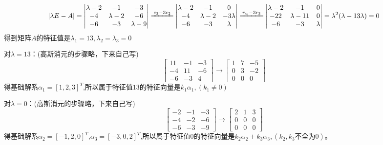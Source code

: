 \documentclass{article}
\begin{document}
\begin{jie}
\begin{align*}
 |\lambda E-A|=
 \begin{vmatrix}
  \lambda-2 & -1 & -3\\
  -4& \lambda-2 & -6\\
  -6 & -3 & \lambda-9
 \end{vmatrix}\xlongequal{\substack{c_{3}-3c_{2}}}
  \begin{vmatrix}
  \lambda-2 & -1 & 0\\
  -4& \lambda-2 & -3\lambda\\
  -6 & -3 & \lambda
 \end{vmatrix}\xlongequal{\substack{r_{w}-3r_{3}}}
  \begin{vmatrix}
  \lambda-2 & -1 & 0\\
  -22& \lambda-11 & 0\\
  -6 & -3 & \lambda
 \end{vmatrix}=\lambda^2(\lambda-13\lambda)=0
\end{align*}
得到矩阵$A$的特征值是$\lambda_1=13,\lambda_2=\lambda_3=0$

对$\lambda=13$：(高斯消元的步骤略，下来自己写)
\begin{equation*}
  \begin{bmatrix}
  11 & -1 & -3\\
  -4& 11 & -6\\
  -6 & -3 & 4
  \end{bmatrix}\rightarrow
  \begin{bmatrix}
  1& 7 & -5\\
  0& 3 & -2\\
  0 & 0 & 0
  \end{bmatrix}
\end{equation*}
得基础解系$\alpha_1=[1,2,3]^T$,所以属于特征值$13$的特征向量是$k_1\alpha_1,(k_1\neq 0)$

对$\lambda=0$：(高斯消元的步骤略，下来自己写)
\begin{equation*}
  \begin{bmatrix}
  -2 & -1 & -3\\
  -4& -2 & -6\\
  -6 & -3 & -9
  \end{bmatrix}\rightarrow
  \begin{bmatrix}
  2& 1 & 3\\
  0& 0 & 0\\
  0 & 0 & 0
  \end{bmatrix}
\end{equation*}
得基础解系$\alpha_2=[-1,2,0]^T$,$\alpha_3=[-3,0,2]^T$,所以属于特征值$0$的特征向量是$k_2\alpha_2+k_3\alpha_3,(k_2,k_3\text{不全为0})$。
\end{jie}
\end{document}
